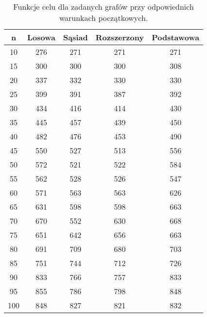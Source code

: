     \begin{table}[H]
    \begin{tabular}{|c | c | c | c | c |} 
     \hline
     n & Losowa & Sąsiad & Rozszerzony & Podstawowa \\ [0.5ex] 
     \hline\hline
      10 &  276 & 271 & 271 & 271 \\
      15 &  300 & 300 & 300 & 308 \\
      20 &  337 & 332 & 330 & 330 \\
      25 &  399 & 391 & 387 & 392 \\
      30 &  434 & 416 & 414 & 430 \\
      35 &  445 & 457 & 439 & 450 \\
      40 &  482 & 476 & 453 & 490 \\
      45 &  550 & 527 & 513 & 556 \\
      50 &  572 & 521 & 522 & 584 \\
      55 &  562 & 528 & 526 & 547 \\
      60 &  571 & 563 & 563 & 626 \\
      65 &  631 & 598 & 598 & 663 \\
      70 &  670 & 552 & 630 & 668 \\
      75 &  651 & 642 & 656 & 663 \\
      80 &  691 & 709 & 680 & 703 \\
      85 &  751 & 744 & 712 & 726 \\ 
      90 &  833 & 766 & 757 & 833 \\
      95 &  855 & 786 & 798 & 848 \\ 
      100 & 848 & 827 & 821 & 832 \\

     \hline
    \end{tabular}
    \caption{Funkcje celu dla zadanych grafów przy odpowiednich warunkach początkowych.}
    \end{table}


